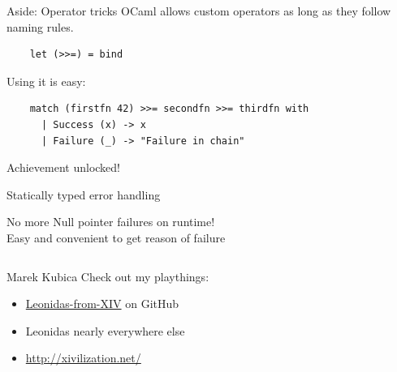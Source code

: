 \documentclass{beamer}
\renewcommand{\example}[1]{{\usebeamercolor[fg]{example text} #1}}
\begin{document}
\begin{frame}[fragile]{Aside: Operator tricks}
  OCaml allows \alert{custom operators} as long as they follow naming rules.

  \begin{verbatim}
    let (>>=) = bind
  \end{verbatim}

  Using it is \example{easy}:

  \begin{verbatim}
    match (firstfn 42) >>= secondfn >>= thirdfn with
      | Success (x) -> x
      | Failure (_) -> "Failure in chain"
  \end{verbatim}
\end{frame}

\begin{frame}{Achievement unlocked!}
  \begin{center}
    {\Huge Statically typed error handling}
  \end{center}
  \checkmark No more Null pointer failures on runtime!\\
  \checkmark Easy and convenient to get reason of failure
\end{frame}

{
%
\begin{frame}[plain]
  \begin{columns}
  \begin{block}{Marek Kubica}
    Check out my playthings:
    \begin{itemize}
      \item \href{https://github.com/Leonidas-from-XIV}{Leonidas-from-XIV} on GitHub
      \item Leonidas nearly everywhere else
      \item \url{http://xivilization.net/}
    \end{itemize}
  \end{block}
  \end{columns}
\end{frame}
}
\end{document}

